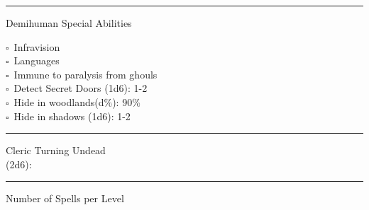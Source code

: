 \documentclass{article}
\begin{document}
\rule{\textwidth}{2pt}
\Huge Demihuman Special Abilities\\
\Large


\begin{multicols}{3}
  $\square$~Infravision \\
  $\square$~Languages \\
  $\square$~Immune to paralysis from ghouls\\
  $\square$~Detect Secret Doors (1d6): 1-2 \\
  $\square$~Hide in woodlands(d\%): 90\%\\
  $\square$~Hide in shadows (1d6): 1-2
\end{multicols} \rule{\textwidth}{2pt}
\Huge Cleric Turning Undead \\ 
(2d6): \hfill \Large
   \hfill
   \hfill
   \hfill



  

  

  \rule{\textwidth}{2pt}
  \Huge
  Number of Spells per Level


  \vfill

  
\end{document}
